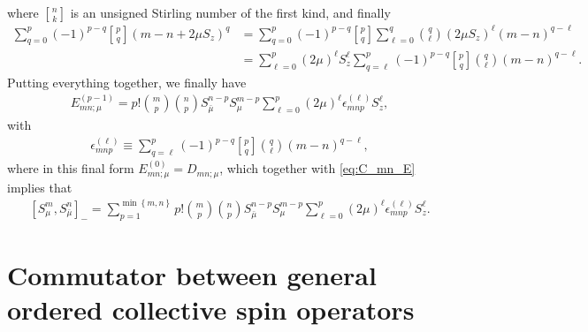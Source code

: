 \documentclass[aps,notitlepage,nofootinbib,11pt]{revtex4-1}
\newcommand{\p}[1]{\left(#1\right)} %
\renewcommand{\sp}[1]{\left[#1\right]} %
\renewcommand{\set}[1]{\left\{#1\right\}} %
\newcommand{\bmu}{{\bar\mu}}
\newcommand{\1}{\mathds{1}}
\begin{document}
where ${ n \brack k }$ is an unsigned Stirling number of the first
kind, and finally
\begin{align}
  \sum_{q=0}^p \p{-1}^{p-q} { p \brack q } \p{m-n+2\mu S_z}^q
  &= \sum_{q=0}^p \p{-1}^{p-q} { p \brack q } \sum_{\ell=0}^q
  { q \choose \ell } \p{2\mu S_z}^\ell \p{m-n}^{q-\ell} \\
  &= \sum_{\ell=0}^p \p{2\mu}^\ell S_z^\ell
  \sum_{q=\ell}^p \p{-1}^{p-q}
  { p \brack q } { q \choose \ell } \p{m-n}^{q-\ell}.
\end{align}
Putting everything together, we finally have
\begin{align}
  E_{mn;\mu}^{(p-1)}
  = p! { m \choose p } { n \choose p }
  S_\bmu^{n-p} S_\mu^{m-p}
  \sum_{\ell=0}^p \p{2\mu}^\ell \epsilon_{mnp}^{(\ell)} S_z^\ell,
\end{align}
with
\begin{align}
  \epsilon_{mnp}^{(\ell)}
  \equiv \sum_{q=\ell}^p \p{-1}^{p-q}
  { p \brack q } { q \choose \ell } \p{m-n}^{q-\ell},
  \label{eq:epsilon}
\end{align}
where in this final form $E_{mn;\mu}^{(0)} = D_{mn;\mu}$, which
together with \eqref{eq:C_mn_E} implies that
\begin{align}
  \sp{S_\mu^m, S_\bmu^n}_-
  = \sum_{p=1}^{\min\set{m,n}}
  p! { m \choose p } { n \choose p } S_\bmu^{n-p} S_\mu^{m-p}
  \sum_{\ell=0}^p \p{2\mu}^\ell \epsilon_{mnp}^{(\ell)} S_z^\ell.
  \label{eq:comm_mu}
\end{align}


\section{Commutator between general ordered collective spin operators}
\label{sec:comm_general}
\end{document}

